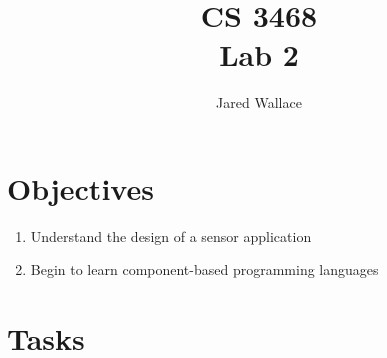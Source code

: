 \documentclass[letterpaper,12pt]{article}
\title{\Large CS 3468\\Lab 2}
\author{Jared Wallace}
\date{}
\begin{document}
\maketitle

\vspace{30mm}

\section*{Objectives}
\begin{enumerate}
\item Understand the design of a sensor application
\item Begin to learn component-based programming languages
\end{enumerate}

\section*{Tasks}
\end{document}
